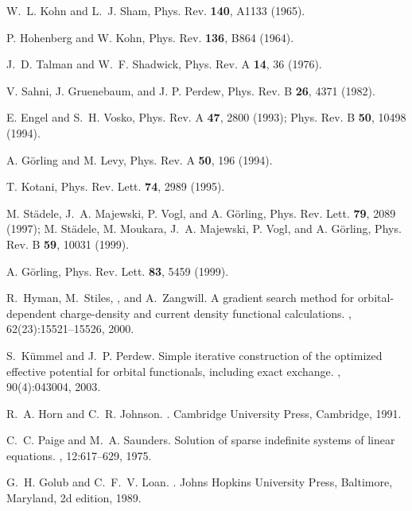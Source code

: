 \documentclass{article}
\begin{document}
\begin{thebibliography}{1}

W.~L. Kohn and L.~J. Sham, Phys. Rev. {\bf 140}, A1133 (1965).

P. Hohenberg and W. Kohn, Phys. Rev. {\bf 136}, B864 (1964).

J.~D. Talman and W.~F. Shadwick, Phys. Rev. A {\bf 14}, 36 (1976).

V. Sahni, J. Gruenebaum, and J. P. Perdew, Phys. Rev. B {\bf 26}, 4371 (1982).

  E. Engel and S.~H. Vosko, Phys. Rev. A {\bf 47}, 2800 (1993);
Phys. Rev. B {\bf 50}, 10498 (1994).

A. G\"{o}rling and M. Levy, Phys. Rev. A {\bf 50}, 196 (1994).

T. Kotani, Phys. Rev. Lett. {\bf 74}, 2989 (1995).

M. St\"{a}dele, J.~A. Majewski, P. Vogl, and A. G\"{o}rling, Phys. Rev. Lett. {\bf 79}, 2089 (1997);
M. St\"{a}dele, M. Moukara, J.~A. Majewski, P. Vogl, and A. G\"{o}rling, Phys. Rev. B {\bf 59},
10031 (1999).

A. G\"{o}rling, Phys. Rev. Lett. {\bf 83}, 5459 (1999).

R.~Hyman, M.~Stiles, , and A.~Zangwill.
\newblock A gradient search method for orbital-dependent charge-density and
  current density functional calculations.
, 62(23):15521--15526, 2000.

S.~K\"{u}mmel and J.~P. Perdew.
\newblock Simple iterative construction of the optimized effective potential
  for orbital functionals, including exact exchange.
, 90(4):043004, 2003.

R.~A. Horn and C.~R. Johnson.
.
\newblock Cambridge University Press, Cambridge, 1991.

C.~C. Paige and M.~A. Saunders.
\newblock Solution of sparse indefinite systems of linear equations.
, 12:617--629, 1975.

G.~H. Golub and C.~F.~V. Loan.
.
\newblock Johns Hopkins University Press, Baltimore, Maryland, 2d edition,
  1989.

\end{thebibliography}
\end{document}
